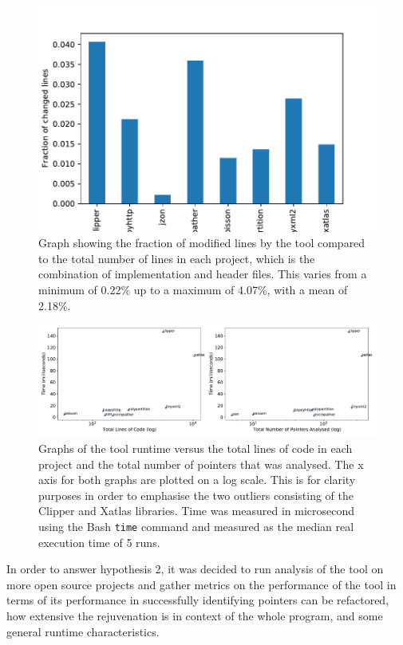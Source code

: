 \documentclass{mpaper}
\begin{document}
    \begin{figure}
        \centering
        \includegraphics[scale=0.8]{images/lines.pdf}
        \caption{Graph showing the fraction of modified lines by the tool compared to the total number of lines in each project, which is the combination of implementation and header files. This varies from a minimum of 0.22\% up to a maximum of 4.07\%, with a mean of 2.18\%.}
        \label{fig:lines}
    \end{figure}

    \begin{figure}
        \centering
        \includegraphics[scale=0.475]{images/time.pdf}
        \caption{Graphs of the tool runtime versus the total lines of code in each project and the total number of pointers that was analysed. The x axis for both graphs are plotted on a log scale. This is for clarity purposes in order to emphasise the two outliers consisting of the Clipper and Xatlas libraries. Time was measured in microsecond using the Bash \texttt{time} command and measured as the median real execution time of 5 runs.}
        \label{fig:time}
    \end{figure}

    In order to answer hypothesis 2, it was decided to run analysis of the tool on more open source projects and gather metrics on the performance of the tool in terms of its performance in successfully identifying pointers can be refactored, how extensive the rejuvenation is in context of the whole program, and some general runtime characteristics. 
    
\end{document}

